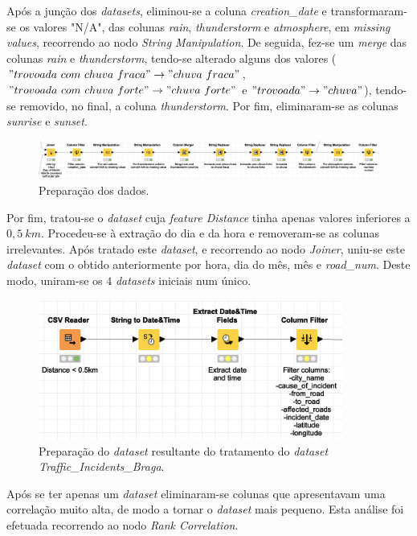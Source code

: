 \documentclass[a4paper, 12pt]{article}
\begin{document}
Após a junção dos \textit{datasets}, eliminou-se a coluna \textit{creation\_date} e transformaram-se os valores "N/A", das colunas \textit{rain}, \textit{thunderstorm} e \textit{atmosphere}, em \textit{missing values}, recorrendo ao nodo \textit{String Manipulation}. De seguida, fez-se um \textit{merge} das colunas \textit{rain} e \textit{thunderstorm}, tendo-se alterado alguns dos valores ($"trovoada \ com \ chuva \ fraca" \rightarrow "chuva \ fraca"$, $"trovoada \ com \ chuva \ forte" \rightarrow "chuva \ forte"$ e $"trovoada" \rightarrow "chuva"$), tendo-se removido, no final, a coluna \textit{thunderstorm}. Por fim, eliminaram-se as colunas \textit{sunrise} e \textit{sunset}.

\begin{figure}[H]
	\centering
	\includegraphics[width=15cm]{prep}
	\caption{Preparação dos dados.}
\end{figure}

Por fim, tratou-se o \textit{dataset} cuja \textit{feature Distance} tinha apenas valores inferiores a $0,5 \ km$. Procedeu-se à extração do dia e da hora e removeram-se as colunas irrelevantes. Após tratado este \textit{dataset}, e recorrendo ao nodo \textit{Joiner}, uniu-se este \textit{dataset} com o obtido anteriormente por hora, dia do mês, mês e \textit{road\_num}. Deste modo, uniram-se os $4$ \textit{datasets} iniciais num único.

\begin{figure}[H]
	\centering
	\includegraphics[width=10cm]{Incident}
	\caption{Preparação do \textit{dataset} resultante do tratamento do \textit{dataset Traffic\_Incidents\_Braga}.}
\end{figure}

Após se ter apenas um \textit{dataset} eliminaram-se colunas que apresentavam uma correlação muito alta, de modo a tornar o \textit{dataset} mais pequeno. Esta análise foi efetuada recorrendo ao nodo \textit{Rank Correlation}.
\end{document}
